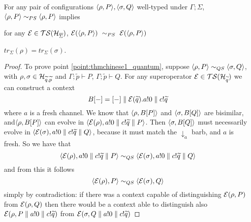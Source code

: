 \begin{theorem}
	For any pair of configurations $\langle\rho, P\rangle, \langle\sigma, Q\rangle$ well-typed under $\Gamma; \Sigma$, 
	$\langle\rho, P\rangle \sim_{PS} \langle\rho, P\rangle$ implies
	\begin{enumerate}
		{\item for any $\mathcal{E} \in \mathcal{TS}(\mathcal{H}_{\overline{\Sigma}})$, $\mathcal{E} (\langle\rho, P\rangle)\ \sim_{PS} \ \mathcal{E} (\langle\rho, P\rangle)$\label{point:thmchinese1_quantum}}
		{\item $tr_{\Sigma}(\rho) = tr_{\Sigma}(\sigma)$. \label{point:thmchinese2_quantum}}
	\end{enumerate}
\end{theorem}
\begin{proof}
 To prove point \ref{point:thmchinese1_quantum}, suppose $\langle\rho, P\rangle \sim_{QS} \langle\sigma, Q\rangle$, with $\rho, \sigma \in \mathcal{H}_{\widetilde{q},\widetilde{p}}$ and $\Gamma;\widetilde{p} \vdash P$, $\Gamma;\widetilde{p} \vdash Q$.  For any superoperator $\mathcal{E} \in \mathcal{TS}(\mathcal{H}_{\widetilde{q}})$ we can construct a context $$B[{-}] = [{-}] \parallel \mathcal{E}({\widetilde{q}}).a!0 \parallel c!\widetilde{q}$$ where $a$ is a fresh channel. We know that $\langle\rho, B[P]\rangle$ and $\langle\sigma, B[Q]\rangle$ are bisimilar, and$\langle\rho, B[P]\rangle$ can evolve in $\langle\mathcal{E}(\rho), a!0 \parallel c!\widetilde{q} \parallel P\rangle$. Then $\langle\sigma, B[Q]\rangle$ must necessarily evolve in $\langle\mathcal{E}(\sigma), a!0 \parallel c!\widetilde{q} \parallel Q\rangle$, because it must match the $\downarrow_a$ barb, and $a$ is fresh. So we have that  
\[ \langle\mathcal{E}(\rho), a!0 \parallel c!\widetilde{q} \parallel P\rangle \sim_{QS} 
  \langle\mathcal{E}(\sigma), a!0 \parallel c!\widetilde{q} \parallel Q\rangle
\]
and from this it follows 
\[ \langle\mathcal{E}(\rho), P\rangle \sim_{QS} 
  \langle\mathcal{E}(\sigma), Q\rangle
\] simply by contradiction: if there was a context capable of distinguishing $\mathcal{E}(\rho, P)$ from $\mathcal{E}(\rho, Q)$ then there would be a context able to distinguish also $\mathcal{E}(\rho, P \parallel a!0 \parallel c!\widetilde{q})$ from $\mathcal{E}(\sigma, Q \parallel a!0 \parallel c!\widetilde{q})$


\end{proof}
